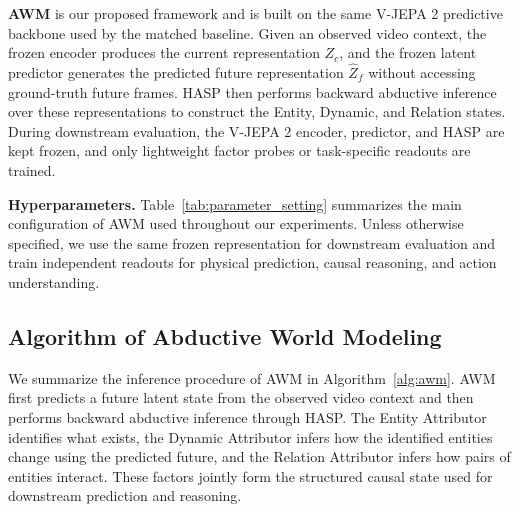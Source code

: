 \documentclass{article}
\begin{document}
\textbf{AWM}
is our proposed framework and is built on the same V-JEPA 2 predictive backbone used by the matched baseline. Given an observed video context, the frozen encoder produces the current representation $Z_c$, and the frozen latent predictor generates the predicted future representation $\widehat{Z}_f$ without accessing ground-truth future frames. HASP then performs backward abductive inference over these representations to construct the Entity, Dynamic, and Relation states. During downstream evaluation, the V-JEPA 2 encoder, predictor, and HASP are kept frozen, and only lightweight factor probes or task-specific readouts are trained.

\textbf{Hyperparameters.}
Table~\ref{tab:parameter_setting} summarizes the main configuration of AWM used throughout our experiments. Unless otherwise specified, we use the same frozen representation for downstream evaluation and train independent readouts for physical prediction, causal reasoning, and action understanding.

\subsection{Algorithm of Abductive World Modeling}
\label{appendix:algorithm}

We summarize the inference procedure of AWM in Algorithm~\ref{alg:awm}. AWM first predicts a future latent state from the observed video context and then performs backward abductive inference through HASP. The Entity Attributor identifies what exists, the Dynamic Attributor infers how the identified entities change using the predicted future, and the Relation Attributor infers how pairs of entities interact. These factors jointly form the structured causal state used for downstream prediction and reasoning.
\end{document}
